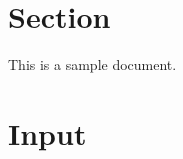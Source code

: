 \documentclass{article}
\begin{document}
\section{Section}
This is a sample document.

\section{Input}


\end{document}
